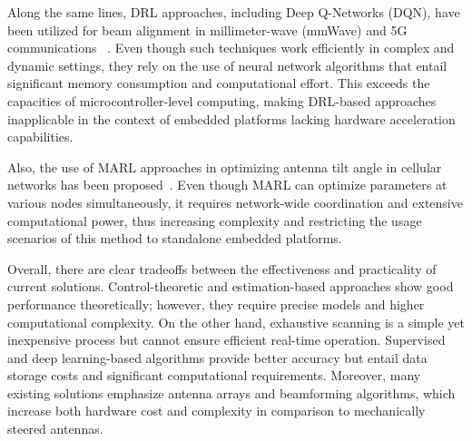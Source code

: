 Along the same lines, DRL approaches, including Deep Q-Networks (DQN), have been utilized for beam alignment in millimeter-wave (mmWave) and 5G communications ~\cite{ref17}. Even though such techniques work efficiently in complex and dynamic settings, they rely on the use of neural network algorithms that entail significant memory consumption and computational effort. This exceeds the capacities of microcontroller-level computing, making DRL-based approaches inapplicable in the context of embedded platforms lacking hardware acceleration capabilities.

Also, the use of MARL approaches in optimizing antenna tilt angle in cellular networks has been proposed~\cite{ref18}. Even though MARL can optimize parameters at various nodes simultaneously, it requires network-wide coordination and extensive computational power, thus increasing complexity and restricting the usage scenarios of this method to standalone embedded platforms.

Overall, there are clear tradeoffs between the effectiveness and practicality of current solutions. Control-theoretic and estimation-based approaches show good performance theoretically; however, they require precise models and higher computational complexity. On the other hand, exhaustive scanning is a simple yet inexpensive process but cannot ensure efficient real-time operation. Supervised and deep learning-based algorithms provide better accuracy but entail data storage costs and significant computational requirements. Moreover, many existing solutions emphasize antenna arrays and beamforming algorithms, which increase both hardware cost and complexity in comparison to mechanically steered antennas.

\newpage
\setlength{\LTpre}{1cm}   %
\setlength{\LTpost}{1cm}  %
\renewcommand{\arraystretch}{1.4}
\setlength{\tabcolsep}{8pt}

